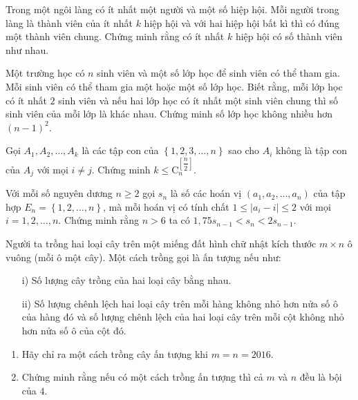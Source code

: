 \begin{bt}[Switzerland 2010]
 Trong một ngôi làng có ít nhất một người và một số hiệp hội. Mỗi người trong làng là thành viên của ít nhất $k$ hiệp hội và với hai hiệp hội bất kì thì có đúng một thành viên chung. Chứng minh rằng có ít nhất $k$ hiệp hội có số thành viên như nhau.
\end{bt}

\begin{bt}[Iran 2011]
 Một trường học có $n$ sinh viên và một số lớp học để sinh viên có thể tham gia. Mỗi sinh viên có thể tham gia một hoặc một số lớp học. Biết rằng, mỗi lớp học có ít nhất $2$ sinh viên và nếu hai lớp học có ít nhất một sinh viên chung thì số sinh viên của mỗi lớp là khác nhau. Chứng minh số lớp học không nhiều hơn $(n-1)^2$.
\end{bt}

\begin{bt}
 Gọi $A_1, A_2,\ldots,A_k$ là các tập con của $\left\{1,2,3,\ldots,n\right\}$ sao cho $A_i$ không là tập con của $A_j$ với mọi $i \neq j$. Chứng minh $k \le \mathrm{C}_n^{\left[\dfrac{n}{2}\right]}$.
\end{bt}

\begin{bt}[VMO 2003]
 Với mỗi số nguyên dương $n \ge 2$ gọi $s_n$ là số các hoán vị $(a_1, a_2,\ldots,a_n)$ của tập hợp $E_n=\left\{1,2,\ldots,n\right\}$, mà mỗi hoán vị có tính chất $1 \le |a_i-i| \le 2$ với mọi $i=1, 2,\ldots, n$. Chứng minh rằng $n>6$ ta có $1{,}75s_{n-1}<s_n<2s_{n-1}$.
\end{bt}

\begin{bt}[VMO 2016]
 Người ta trồng hai loại cây trên một miếng đất hình chữ nhật kích thước $m \times n$ ô vuông (mỗi ô một cây). Một cách trồng gọi là ấn tượng nếu như:
 \begin{itemize}
 	\item[i)] Số lượng cây trồng của hai loại cây bằng nhau.
 	\item[ii)] Số lượng chênh lệch hai loại cây trên mỗi hàng không nhỏ hơn nửa số ô của hàng đó và số lượng chênh lệch của hai loại cây trên mỗi cột không nhỏ hơn nửa số ô của cột đó.
 \end{itemize}
 \begin{enumerate}
 	\item Hãy chỉ ra một cách trồng cây ấn tượng khi $m=n=2016$. 
 	\item Chứng minh rằng nếu có một cách trồng ấn tượng thì cả $m$ và $n$ đều là bội của $4$. 
 \end{enumerate}
\end{bt}

